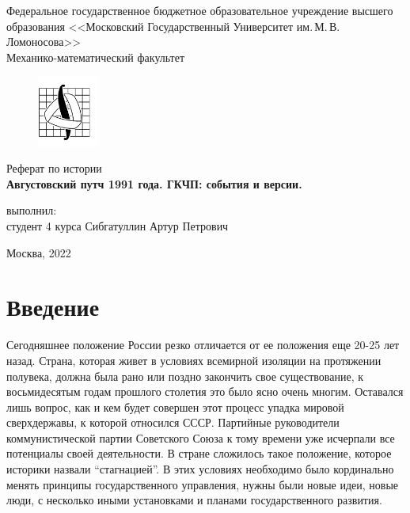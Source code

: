 \documentclass[12pt]{extarticle}
\begin{document}
\renewcommand{\contentsname}{Содержание}
\newenvironment{changemargin}[1]{
  \begin{list}{}{
    \setlength{\voffset}{#1}
  }
  \item[]}{\end{list}}


\begin{titlepage}
	\begin{center}
		
		Федеральное государственное бюджетное образовательное учреждение высшего образования 
		<<Московский Государственный Университет им.\,М.\,В.\,Ломоносова>>\\
		
		Механико-математический факультет
		
		\begin{figure}[!htp]
			\begin{center}
				{\includegraphics[width=20mm]{mmlogo.png}}
			\end{center}
		\end{figure}
		
		\vspace{3cm}
		
		Реферат по истории\\
		{\bf Августовский путч 1991 года. ГКЧП: события и версии.}
		
		\vspace{8cm}
		\begin{flushright}
			{ выполнил:}\\
			студент 4 курса Сибгатуллин Артур Петрович\\[0.5cm]
		\end{flushright}
		\vspace{1cm}
		
		\normalsize Москва, 2022
	\end{center}
\end{titlepage}


\tableofcontents

\newpage
\section{Введение}
Сегодняшнее положение России резко отличается от ее положения еще 20-25 лет назад. Страна, которая живет в условиях всемирной изоляции на протяжении полувека, должна была рано или поздно закончить свое существование, к восьмидесятым годам прошлого столетия это было ясно очень многим. Оставался лишь вопрос, как и кем будет совершен этот процесс упадка мировой сверхдержавы, к которой относился СССР. Партийные руководители коммунистической партии Советского Союза к тому времени уже исчерпали все потенциалы своей деятельности. В стране сложилось такое положение, которое историки назвали “стагнацией”. В этих условиях необходимо было кординально менять принципы государственного управления, нужны были новые идеи, новые люди, с несколько иными установками и планами государственного развития.
\end{document}
